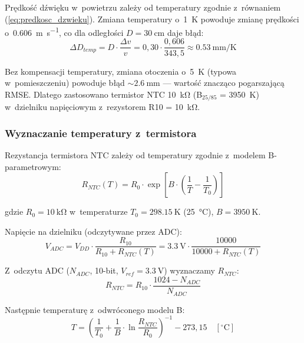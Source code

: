 \documentclass[a4paper,11pt]{article}
\begin{document}
Prędkość dźwięku w~powietrzu zależy od temperatury zgodnie z~równaniem
(\ref{eq:predkosc_dzwieku}). Zmiana temperatury o~\SI{1}{\kelvin} powoduje
zmianę prędkości o~\SI{0,606}{\metre\per\second}, co dla odległości
$D = \SI{30}{\centi\metre}$ daje błąd:
\begin{equation}
    \Delta D_{temp} = D \cdot \frac{\Delta v}{v} = 0{,}30 \cdot \frac{0{,}606}{343{,}5} \approx \SI{0,53}{\milli\metre\per\kelvin}
    \label{eq:blad_temp}
\end{equation}

Bez kompensacji temperatury, zmiana otoczenia o~\SI{5}{\kelvin} (typowa
w~pomieszczeniu) powoduje błąd ${\sim}\SI{2,6}{\milli\metre}$ --- wartość
znacząco pogarszającą RMSE. Dlatego zastosowano termistor NTC \SI{10}{\kilo\ohm}
(B$_{25/85}$ = \SI{3950}{\kelvin}) w~dzielniku napięciowym z~rezystorem
R10 = \SI{10}{\kilo\ohm}.

\subsubsection{Wyznaczanie temperatury z~termistora}

Rezystancja termistora NTC zależy od temperatury zgodnie z~modelem
B-parametrowym:
\begin{equation}
    R_{NTC}(T) = R_0 \cdot \exp\!\left[B \cdot \left(\frac{1}{T} - \frac{1}{T_0}\right)\right]
    \label{eq:ntc_model}
\end{equation}

gdzie $R_0 = \SI{10}{\kilo\ohm}$ w~temperaturze $T_0 = \SI{298,15}{\kelvin}$
(\SI{25}{\celsius}), $B = \SI{3950}{\kelvin}$.

Napięcie na dzielniku (odczytywane przez ADC):
\begin{equation}
    V_{ADC} = V_{DD} \cdot \frac{R_{10}}{R_{10} + R_{NTC}(T)} = \SI{3,3}{\volt} \cdot \frac{10000}{10000 + R_{NTC}(T)}
    \label{eq:dzielnik_ntc}
\end{equation}

Z~odczytu ADC ($N_{ADC}$, 10-bit, $V_{ref} = \SI{3,3}{\volt}$) wyznaczamy
$R_{NTC}$:
\begin{equation}
    R_{NTC} = R_{10} \cdot \frac{1024 - N_{ADC}}{N_{ADC}}
    \label{eq:rntc_z_adc}
\end{equation}

Następnie temperaturę z~odwróconego modelu B:
\begin{equation}
    T = \left(\frac{1}{T_0} + \frac{1}{B} \cdot \ln\frac{R_{NTC}}{R_0}\right)^{-1} - 273{,}15 \quad [^\circ\text{C}]
    \label{eq:steinhart}
\end{equation}
\end{document}
